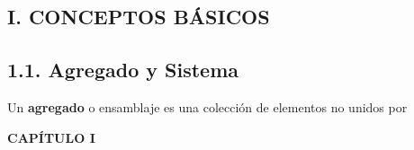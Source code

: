 {\begin{center}
\section*{\textbf{I. CONCEPTOS BÁSICOS}} %
\end{center}

\subsection*{\textbf{1.1. Agregado y Sistema}} %
Un \textbf{agregado} o ensamblaje es una colección de elementos no unidos por}

\newpage

\fancyhf{}
\fancyhead[l]{\thepage} 
\begin{center}
{\fontsize{18}{20}\selectfont \textbf{CAPÍTULO I}}
\end{center}

\vspace{1cm}

